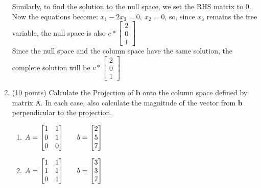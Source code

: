 \documentclass{article}%
\begin{document}
\begin{enumerate}
    Similarly, to find the solution to the null space, we set the RHS matrix to 0. Now the equations become: $x_1 -2x_3 = 0, \ x_2 = 0$, so, since $x_3$ remains the free variable, the null space is also $ c * \begin{bmatrix} 2 \\ 0 \\ 1 \end{bmatrix}$ \\
    Since the null space and the column space have the same solution, the complete solution will be $ c * \begin{bmatrix} 2 \\ 0 \\ 1 \end{bmatrix} $


    \item (10 points) Calculate the Projection of \emph{$\mathbf{b}$} onto the column space defined by matrix A.  In each case, also calculate the magnitude of the vector from $\mathbf{b}$ perpendicular to the projection.
    \begin{enumerate}
        \item $A = \begin{bmatrix}
            1 & 1\\
            0 & 1\\
            0 & 0
        \end{bmatrix}\hspace{4ex}
        b = \begin{bmatrix}
            2\\
            5\\
            7
        \end{bmatrix}$
        
        \item $A = \begin{bmatrix}
            1 & 1\\
            1 & 1\\
            0 & 1
        \end{bmatrix}\hspace{4ex}
        b = \begin{bmatrix}
            3\\
            3\\
            7
        \end{bmatrix}$
    \end{enumerate}



\end{enumerate}
\end{document}
